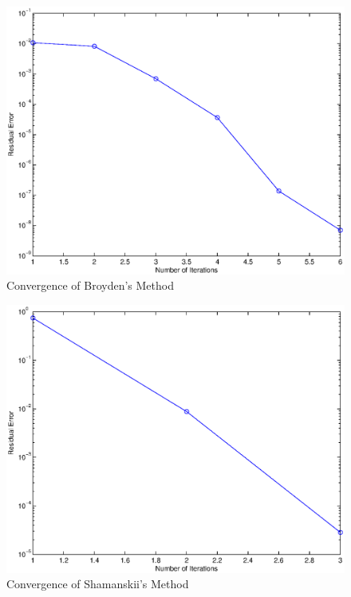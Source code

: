 \documentclass[paper=a4, fontsize=11pt]{scrartcl} %
\numberwithin{equation}{section} %
\numberwithin{figure}{section} %
\numberwithin{table}{section} %
\begin{document}
\begin{center}
\begin{figure}[H]
\centerline{\includegraphics [scale = 0.5] {broydenfig.eps}}
\caption{Convergence of Broyden's Method}
\end{figure}

\begin{figure}[H]
\centerline{\includegraphics [scale = 0.5] {shamfig.eps}}
\caption{Convergence of Shamanskii's Method}
\end{figure}

\end{center}
\fi
\end{document}
